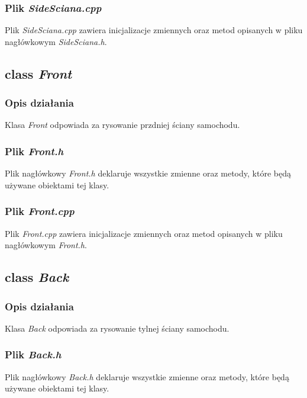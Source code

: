 \documentclass[a4paper, 12pt]{report}
\begin{document}


\subsubsection{Plik \emph{SideSciana.cpp}}

Plik \emph{SideSciana.cpp} zawiera inicjalizacje zmiennych oraz metod opisanych w pliku nagłówkowym \emph{SideSciana.h}.



\subsection{class \emph{Front}}
\subsubsection{Opis działania}
Klasa \emph{Front} odpowiada za rysowanie przdniej ściany samochodu.

\subsubsection{Plik \emph{Front.h}}
Plik nagłówkowy \emph{Front.h} deklaruje wszystkie zmienne oraz metody, które będą używane obiektami tej klasy.


\subsubsection{Plik \emph{Front.cpp}}
Plik \emph{Front.cpp} zawiera inicjalizacje zmiennych oraz metod opisanych w pliku nagłówkowym \emph{Front.h}.


\subsection{class \emph{Back}}
\subsubsection{Opis działania}
Klasa \emph{Back} odpowiada za rysowanie tylnej ściany samochodu.

\subsubsection{Plik \emph{Back.h}}
Plik nagłówkowy \emph{Back.h} deklaruje wszystkie zmienne oraz metody, które będą używane obiektami tej klasy.

\end{document}
